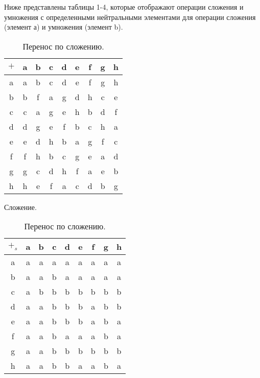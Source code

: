\documentclass[10pt,a4paper,final]{article} %
\begin{document}
	Ниже представлены таблицы 1-4, которые отображают операции сложения и умножения с определенными нейтральными элементами для операции сложения (элемент а) и умножения (элемент b).
	\begin{table}[h!]
		\centering
		\begin{minipage}{.5\textwidth}
			\centering
			\begin{tabular}{c|cccccccc}
				
				$+$ & a & b & c & d & e & f & g & h \\
				\hline
				a & a & b & c & d & e & f & g & h \\
				b & b & f & a & g & d & h & c & e \\
				c & c & a & g & e & h & b & d & f \\
				d & d & g & e & f & b & c & h & a \\
				e & e & d & h & b & a & g & f & c \\
				f & f & h & b & c & g & e & a & d \\
				g & g & c & d & h & f & a & e & b \\
				h & h & e & f & a & c & d & b & g \\
				
			\end{tabular}
			\caption{Сложение.}
		\end{minipage}%
		\begin{minipage}{.5\textwidth}
			\centering
			\begin{tabular}{c|cccccccc}
				
				$+_s$ & a & b & c & d & e & f & g & h \\
				\hline
				a & a & a & a & a & a & a & a & a \\
				b & a & a & b & a & a & a & a & a \\
				c & a & b & b & b & b & b & b & b \\
				d & a & a & b & b & b & a & b & b \\
				e & a & a & b & b & b & a & b & a \\
				f & a & a & b & a & a & a & b & a \\
				g & a & a & b & b & b & b & b & b \\
				h & a & a & b & b & a & a & b & a \\
				
			\end{tabular}
			\caption{Перенос по сложению.}
		\end{minipage}
	\end{table}
	
\end{document}
